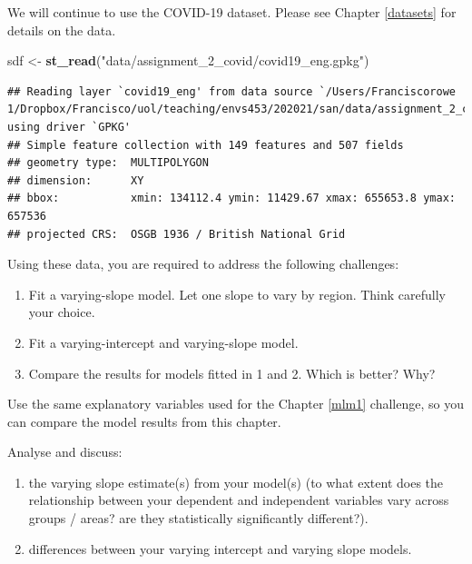 \documentclass[
]{book}
\newenvironment{Shaded}{\begin{snugshade}}{\end{snugshade}}
\newcommand{\KeywordTok}[1]{\textcolor[rgb]{0.13,0.29,0.53}{\textbf{#1}}}
\newcommand{\NormalTok}[1]{#1}
\newcommand{\StringTok}[1]{\textcolor[rgb]{0.31,0.60,0.02}{#1}}
\providecommand{\tightlist}{%
  \setlength{\itemsep}{0pt}\setlength{\parskip}{0pt}}
\begin{document}
We will continue to use the COVID-19 dataset. Please see Chapter \ref{datasets} for details on the data.

\begin{Shaded}
\begin{Highlighting}[]
\NormalTok{sdf <-}\StringTok{ }\KeywordTok{st_read}\NormalTok{(}\StringTok{"data/assignment_2_covid/covid19_eng.gpkg"}\NormalTok{)}
\end{Highlighting}
\end{Shaded}

\begin{verbatim}
## Reading layer `covid19_eng' from data source `/Users/Franciscorowe 1/Dropbox/Francisco/uol/teaching/envs453/202021/san/data/assignment_2_covid/covid19_eng.gpkg' using driver `GPKG'
## Simple feature collection with 149 features and 507 fields
## geometry type:  MULTIPOLYGON
## dimension:      XY
## bbox:           xmin: 134112.4 ymin: 11429.67 xmax: 655653.8 ymax: 657536
## projected CRS:  OSGB 1936 / British National Grid
\end{verbatim}

Using these data, you are required to address the following challenges:

\begin{enumerate}
\def\labelenumi{\arabic{enumi}.}
\item
  Fit a varying-slope model. Let one slope to vary by region. Think carefully your choice.
\item
  Fit a varying-intercept and varying-slope model.
\item
  Compare the results for models fitted in 1 and 2. Which is better? Why?
\end{enumerate}

Use the same explanatory variables used for the Chapter \ref{mlm1} challenge, so you can compare the model results from this chapter.

Analyse and discuss:

\begin{enumerate}
\def\labelenumi{\arabic{enumi}.}
\tightlist
\item
  the varying slope estimate(s) from your model(s) (to what extent does the relationship between your
  dependent and independent variables vary across groups / areas? are they statistically significantly
  different?).
\item
  differences between your varying intercept and varying slope models.
\end{enumerate}
\end{document}
